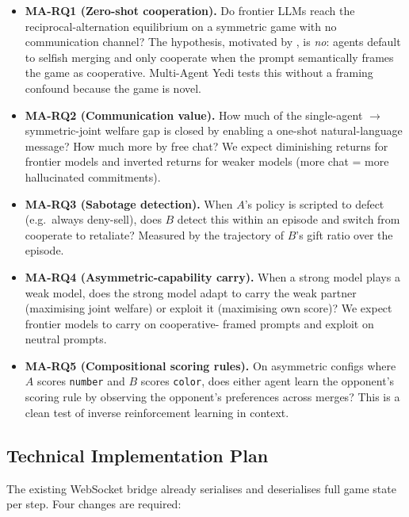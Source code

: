 \documentclass[11pt]{article}
\begin{document}
\begin{itemize}
  \item \textbf{MA-RQ1 (Zero-shot cooperation).} Do frontier LLMs reach
    the reciprocal-alternation equilibrium on a symmetric game with no
    communication channel? The hypothesis, motivated by
    \citet{akata2023playing}, is \emph{no}: agents default to selfish
    merging and only cooperate when the prompt semantically frames the
    game as cooperative. Multi-Agent Yedi tests this without a framing
    confound because the game is novel.
  \item \textbf{MA-RQ2 (Communication value).} How much of the
    single-agent $\to$ symmetric-joint welfare gap is closed by
    enabling a one-shot natural-language message? How much more by
    free chat? We expect diminishing returns for frontier models and
    inverted returns for weaker models (more chat = more hallucinated
    commitments).
  \item \textbf{MA-RQ3 (Sabotage detection).} When $A$'s policy is
    scripted to defect (e.g.\ always deny-sell), does $B$ detect this
    within an episode and switch from cooperate to retaliate? Measured
    by the trajectory of $B$'s gift ratio over the episode.
  \item \textbf{MA-RQ4 (Asymmetric-capability carry).} When a strong
    model plays a weak model, does the strong model adapt to carry the
    weak partner (maximising joint welfare) or exploit it (maximising
    own score)? We expect frontier models to carry on cooperative-
    framed prompts and exploit on neutral prompts.
  \item \textbf{MA-RQ5 (Compositional scoring rules).} On asymmetric
    configs where $A$ scores \texttt{number} and $B$ scores
    \texttt{color}, does either agent learn the opponent's scoring
    rule by observing the opponent's preferences across merges? This
    is a clean test of inverse reinforcement learning in context.
\end{itemize}

\subsection{Technical Implementation Plan}
\label{sec:ma-impl}

The existing WebSocket bridge already serialises and deserialises full
game state per step. Four changes are required:
\end{document}
